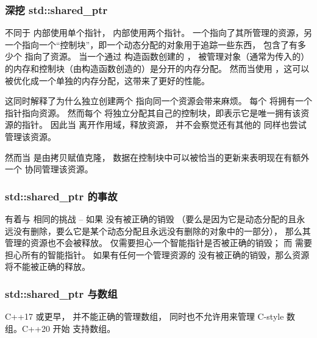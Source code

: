 \documentclass[../../LearnCpp.tex]{subfiles}
\begin{document}
\subsubsection*{深挖 std::shared\_ptr}

不同于  内部使用单个指针，
 内部使用两个指针。
一个指向了其所管理的资源，另一个指向一个“控制块”，即一个动态分配的对象用于追踪一些东西，
包含了有多少个  指向了资源。
当一个通过  构造函数创建的 ，
被管理对象（通常为传入的）的内存和控制块（由构造函数创造的）是分开的内存分配。
然而当使用 ，这可以被优化成一个单独的内存分配，这带来了更好的性能。

这同时解释了为什么独立创建两个  指向同一个资源会带来麻烦。
每个  将拥有一个指针指向资源。
然而每个  将独立分配其自己的控制块，即表示它是唯一拥有该资源的指针。
因此当  离开作用域，释放资源，
并不会察觉还有其他的  同样也尝试管理该资源。

然而当  是由拷贝赋值克隆，
数据在控制块中可以被恰当的更新来表明现在有额外一个  协同管理该资源。

\subsubsection*{std::shared\_ptr 的事故}

 有着与  相同的挑战 --
如果  没有被正确的销毁
（要么是因为它是动态分配的且永远没有删除，要么它是某个动态分配且永远没有删除的对象中的一部分），
那么其管理的资源也不会被释放。 仅需要担心一个智能指针是否被正确的销毁；
而  需要担心所有的智能指针。
如果有任何一个管理资源的  没有被正确的销毁，那么资源将不能被正确的释放。

\subsubsection*{std::shared\_ptr 与数组}

C++17 或更早， 并不能正确的管理数组，
同时也不允许用来管理 C-style 数组。C++20 开始  支持数组。
\end{document}
